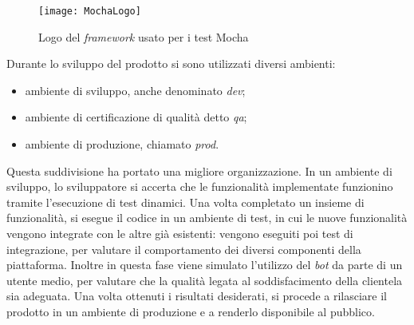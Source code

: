 \begin{figure}[H]
  \centering
  \texttt{[image: MochaLogo]}
  \caption{Logo del \textit{framework} usato per i test Mocha}
\end{figure}

Durante lo sviluppo del prodotto si sono utilizzati diversi ambienti:
\begin{itemize}
  \item ambiente di sviluppo, anche denominato \textit{dev};
  \item ambiente di certificazione di qualità detto \textit{qa};
  \item ambiente di produzione, chiamato \textit{prod}.
\end{itemize}
Questa suddivisione ha portato una migliore organizzazione. In un ambiente di
sviluppo, lo sviluppatore si accerta che le funzionalità implementate
funzionino tramite l'esecuzione di test dinamici.
Una volta completato un insieme di funzionalità, si esegue il codice in un
ambiente di test, in cui le nuove funzionalità vengono integrate con le
altre già esistenti: vengono eseguiti poi test di integrazione, per
valutare il comportamento dei diversi componenti della piattaforma. Inoltre
in questa fase viene simulato l'utilizzo del \textit{bot} da parte di un
utente medio, per valutare che la qualità legata al soddisfacimento della
clientela sia adeguata.
Una volta ottenuti i risultati desiderati, si procede a rilasciare il
prodotto in un ambiente di produzione e a renderlo disponibile al pubblico.
